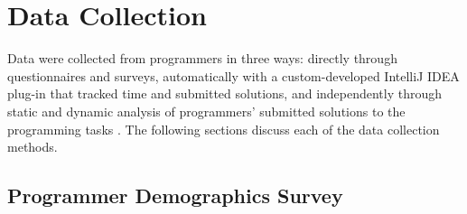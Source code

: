 








\section{Data Collection}

Data were collected from programmers in three ways: directly through questionnaires and surveys, automatically with a custom-developed IntelliJ IDEA plug-in that tracked time and submitted solutions, and independently through static and dynamic analysis of programmers' submitted solutions to the programming tasks \cite{singer2008a-software}.  The following sections discuss each of the data collection methods.

\subsection{Programmer Demographics Survey}

